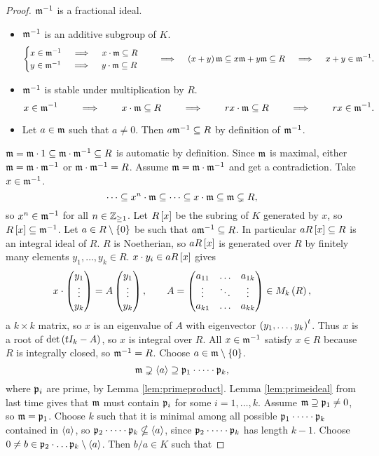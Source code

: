 \begin{proof}
$ \mm^{-1} $ is a fractional ideal.
\begin{itemize}
\item $ \mm^{-1} $ is an additive subgroup of $ K $.
$$
\begin{cases}
x \in \mm^{-1} \quad \implies \quad x \cdot \mm \subseteq R \\
y \in \mm^{-1} \quad \implies \quad y \cdot \mm \subseteq R
\end{cases}
\quad \implies \quad \rb{x + y}\mm \subseteq x\mm + y\mm \subseteq R \quad \implies \quad x + y \in \mm^{-1}.
$$
\item $ \mm^{-1} $ is stable under multiplication by $ R $.
$$ x \in \mm^{-1} \qquad \implies \qquad x \cdot \mm \subseteq R \qquad \implies \qquad rx \cdot \mm \subseteq R \qquad \implies \qquad rx \in \mm^{-1}. $$
\item Let $ a \in \mm $ such that $ a \ne 0 $. Then $ a\mm^{-1} \subseteq R $ by definition of $ \mm^{-1} $.
\end{itemize}
$ \mm = \mm \cdot 1 \subseteq \mm \cdot \mm^{-1} \subseteq R $ is automatic by definition. Since $ \mm $ is maximal, either $ \mm = \mm \cdot \mm^{-1} $ or $ \mm \cdot \mm^{-1} = R $. Assume $ \mm = \mm \cdot \mm^{-1} $ and get a contradiction. Take $ x \in \mm^{-1} $.
$$ \dots \subseteq x^n \cdot \mm \subseteq \dots \subseteq x \cdot \mm \subseteq \mm \subsetneq R, $$
so $ x^n \in \mm^{-1} $ for all $ n \in \Z_{\ge 1} $. Let $ R\sb{x} $ be the subring of $ K $ generated by $ x $, so $ R\sb{x} \subseteq \mm^{-1} $. Let $ a \in R \setminus \cb{0} $ be such that $ a\mm^{-1} \subseteq R $. In particular $ aR\sb{x} \subseteq R $ is an integral ideal of $ R $. $ R $ is Noetherian, so $ aR\sb{x} $ is generated over $ R $ by finitely many elements $ y_1, \dots, y_k \in R $. $ x \cdot y_i \in aR\sb{x} $ gives
$$ x \cdot \threebyone{y_1}{\vdots}{y_k} = A\threebyone{y_1}{\vdots}{y_k}, \qquad A = \threebythree{a_{11}}{\dots}{a_{1k}}{\vdots}{\ddots}{\vdots}{a_{k1}}{\dots}{a_{kk}} \in M_k\rb{R}, $$
a $ k \times k $ matrix, so $ x $ is an eigenvalue of $ A $ with eigenvector $ \rb{y_1, \dots, y_k}^t $. Thus $ x $ is a root of $ \det\rb{tI_k - A} $, so $ x $ is integral over $ R $. All $ x \in \mm^{-1} $ satisfy $ x \in R $ because $ R $ is integrally closed, so $ \mm^{-1} = R $. Choose $ a \in \mm \setminus \cb{0} $.
$$ \mm \supsetneq \ab{a} \supseteq \pp_1 \cdot \dots \cdot \pp_k, $$
where $ \pp_i $ are prime, by Lemma \ref{lem:primeproduct}. Lemma \ref{lem:primeideal} from last time gives that $ \mm $ must contain $ \pp_i $ for some $ i = 1, \dots, k $. Assume $ \mm \supseteq \pp_1 \ne 0 $, so $ \mm = \pp_1 $. Choose $ k $ such that it is minimal among all possible $ \pp_1 \cdot \dots \cdot \pp_k $ contained in $ \ab{a} $, so $ \pp_2 \cdot \dots \cdot \pp_k \nsubseteq \ab{a} $, since $ \pp_2 \cdot \dots \cdot \pp_k $ has length $ k - 1 $. Choose $ 0 \ne b \in \pp_2 \cdot \dots \pp_k \setminus \ab{a} $. Then $ b / a \in K $ such that

\end{proof}
